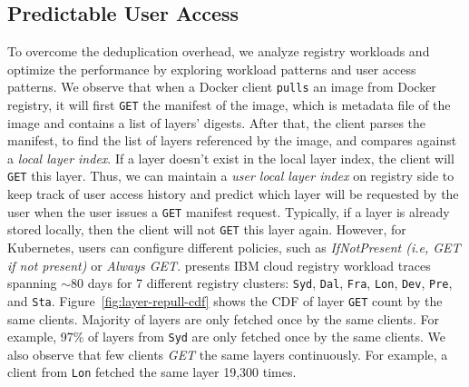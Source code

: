 \subsection{Predictable User Access}
%

%
To overcome the deduplication overhead, we analyze registry workloads
and optimize the performance by exploring workload patterns and user
access patterns.
%
We observe that when a Docker client \texttt{pulls} an image
from Docker registry, it will first \texttt{GET} the manifest of the
image, which is metadata file of the image and contains a list of layers'
digests.
%
After that, the client parses the manifest, to find the list of layers
referenced by the image, and compares against a \emph{local layer index}.
%
If a layer doesn't exist in the local layer index, the client will \texttt{GET}
this layer.
%
Thus, we can maintain a \emph{user local layer index} on registry side to keep
track of user access history and predict which layer will be requested by the
user when the user issues a \texttt{GET} manifest request.
%
Typically, if a layer is already stored locally, then the client will not
\texttt{GET} this layer again.
%
However, for Kubernetes, users can configure different policies, such as
\emph{IfNotPresent (i.e, GET if not present)} or \emph{Always GET}.
%
\cite{dockerworkload} presents IBM cloud registry workload traces spanning
$\sim$80 days for 7 different registry clusters: \texttt{Syd}, \texttt{Dal},
\texttt{Fra}, \texttt{Lon}, \texttt{Dev}, \texttt{Pre}, and \texttt{Sta}.
%
%
Figure~\ref{fig:layer-repull-cdf} shows the
CDF of layer \texttt{GET} count by the same clients. 
%
Majority of layers are only fetched once by the same clients.
For example, 97\% of layers from \texttt{Syd} are only fetched once by the same
clients.
%
We also observe that few clients \emph{GET} the same layers continuously.  For
example, a client from \texttt{Lon} fetched the same layer 19,300 times.

